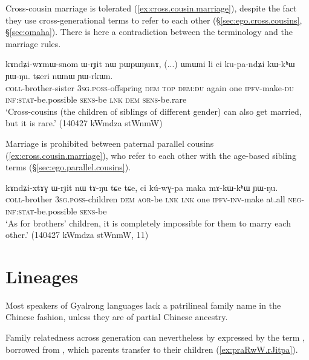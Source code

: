 Cross-cousin marriage is tolerated (\ref{ex:cross.cousin.marriage}), despite the fact they use cross-generational terms to refer to each other (§\ref{sec:ego.cross.cousins}, §\ref{sec:omaha}). There is here a contradiction between the terminology and the marriage rules.

\begin{exe}
\ex \label{ex:cross.cousin.marriage}
\gll kɤndʑi-wɤmɯ-snom ɯ-rɟit nɯ pɯpɯŋunɤ, (...) ɯnɯni li ci ku-pa-ndʑi kɯ-kʰɯ ɲɯ-ŋu. tɕeri nɯnɯ ɲɯ-rkɯn. \\
\textsc{coll}-brother-sister \textsc{3sg}.\textsc{poss}-offspring \textsc{dem} \textsc{top} { } \textsc{dem}:\textsc{du} again one \textsc{ipfv}-make-\textsc{du} \textsc{inf}:\textsc{stat}-be.possible \textsc{sens}-be \textsc{lnk} \textsc{dem} \textsc{sens}-be.rare \\ 
\glt `Cross-cousins (the children of siblings of different gender) can also get married, but it is rare.' (140427 kWmdza stWnmW)
\end{exe}

Marriage is prohibited between paternal parallel cousins (\ref{ex:cross.cousin.marriage}), who refer to each other with the age-based sibling terms (§\ref{sec:ego.parallel.cousins}).

\begin{exe}
\ex \label{ex:FBCh.marriage}
\gll kɤndʑi-xtɤɣ ɯ-rɟit nɯ tɤ-ŋu tɕe tɕe, ci kú-wɣ-pa maka mɤ-kɯ-kʰɯ ɲɯ-ŋu. \\
\textsc{coll}-brother \textsc{3sg}.\textsc{poss}-children \textsc{dem} \textsc{aor}-be \textsc{lnk} \textsc{lnk} one \textsc{ipfv}-\textsc{inv}-make at.all \textsc{neg}-\textsc{inf}:\textsc{stat}-be.possible \textsc{sens}-be \\
\glt `As for brothers' children, it is completely impossible for them to marry each other.' (140427 kWmdza stWnmW, 11)
\end{exe}

\section{Lineages} \label{sec:lineage.kinship}
Most speakers of Gyalrong languages lack a patrilineal family name in the Chinese fashion, unless they are of partial Chinese ancestry. 

Family relatedness across generation can nevertheless by expressed by the term , borrowed from , which parents transfer to their children (\ref{ex:praRwW.rJitpa}).

